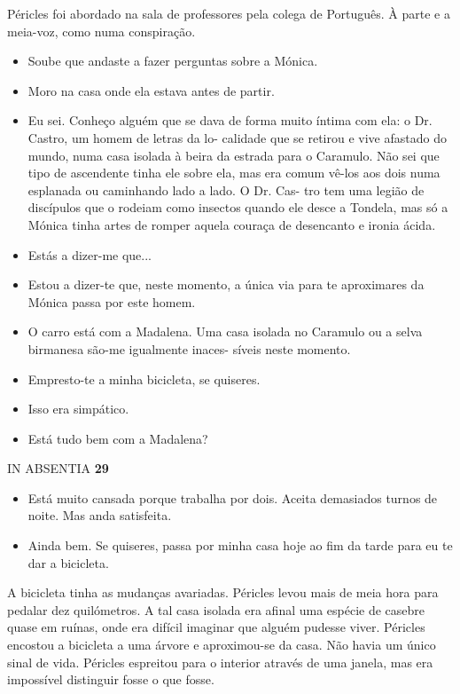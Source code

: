 Péricles foi abordado na sala de professores pela colega de Português. À
parte e a meia-voz, como numa conspiração.

\begin{itemize}
\tightlist
\item
  Soube que andaste a fazer perguntas sobre a Mónica.
\item
  Moro na casa onde ela estava antes de partir.
\item
  Eu sei. Conheço alguém que se dava de forma muito íntima com ela: o
  Dr. Castro, um homem de letras da lo- calidade que se retirou e vive
  afastado do mundo, numa casa isolada à beira da estrada para o
  Caramulo. Não sei que tipo de ascendente tinha ele sobre ela, mas era
  comum vê-los aos dois numa esplanada ou caminhando lado a lado. O Dr.
  Cas- tro tem uma legião de discípulos que o rodeiam como insectos
  quando ele desce a Tondela, mas só a Mónica tinha artes de romper
  aquela couraça de desencanto e ironia ácida.
\item
  Estás a dizer-me que...
\item
  Estou a dizer-te que, neste momento, a única via para te aproximares
  da Mónica passa por este homem.
\item
  O carro está com a Madalena. Uma casa isolada no Caramulo ou a selva
  birmanesa são-me igualmente inaces- síveis neste momento.
\item
  Empresto-te a minha bicicleta, se quiseres.
\item
  Isso era simpático.
\item
  Está tudo bem com a Madalena?
\end{itemize}

IN ABSENTIA \textbf{29}

\begin{itemize}
\tightlist
\item
  Está muito cansada porque trabalha por dois. Aceita demasiados turnos
  de noite. Mas anda satisfeita.
\item
  Ainda bem. Se quiseres, passa por minha casa hoje ao fim da tarde para
  eu te dar a bicicleta.
\end{itemize}

A bicicleta tinha as mudanças avariadas. Péricles levou mais de meia
hora para pedalar dez quilómetros. A tal casa isolada era afinal uma
espécie de casebre quase em ruínas, onde era difícil imaginar que alguém
pudesse viver. Péricles encostou a bicicleta a uma árvore e aproximou-se
da casa. Não havia um único sinal de vida. Péricles espreitou para o
interior através de uma janela, mas era impossível distinguir fosse o
que fosse.


